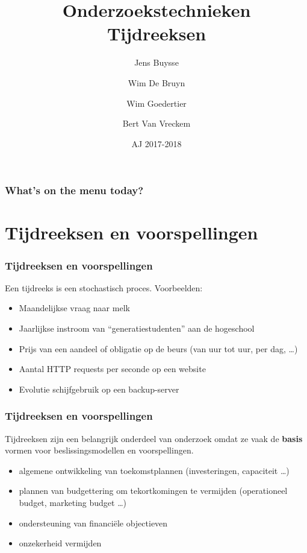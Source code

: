 \documentclass{beamer}
\title[Intro]{Onderzoekstechnieken\\Tijdreeksen}
\author{Jens Buysse \and Wim {De Bruyn} \and Wim Goedertier \and Bert {Van Vreckem}}
\date{AJ 2017-2018}
\begin{document}

\HoGentLogo

\titleframe


\begin{frame}
  \frametitle{What's on the menu today?}

  \tableofcontents
\end{frame}

\section{Tijdreeksen en voorspellingen}

\begin{frame}
  \frametitle{Tijdreeksen en voorspellingen}


  Een tijdreeks is een stochastisch proces. Voorbeelden:

  \begin{itemize}
    \item Maandelijkse vraag naar melk
    \item Jaarlijkse instroom van ``generatiestudenten'' aan de hogeschool
    \item Prijs van een aandeel of obligatie op de beurs (van uur tot uur, per dag, \dots)
    \item Aantal HTTP requests per seconde op een website
    \item Evolutie schijfgebruik op een backup-server
  \end{itemize}
\end{frame}

\begin{frame}
  \frametitle{Tijdreeksen en voorspellingen}

  Tijdreeksen zijn een belangrijk onderdeel van onderzoek omdat ze vaak de \textbf{basis} vormen voor beslissingsmodellen en voorspellingen.

  \begin{itemize}
    \item algemene ontwikkeling van toekomstplannen (investeringen, capaciteit \dots)
    \item plannen van budgettering om tekortkomingen te vermijden (operationeel budget, marketing budget \dots)
    \item ondersteuning van financi\"ele objectieven
    \item onzekerheid vermijden
  \end{itemize}
\end{frame}
\end{document}

